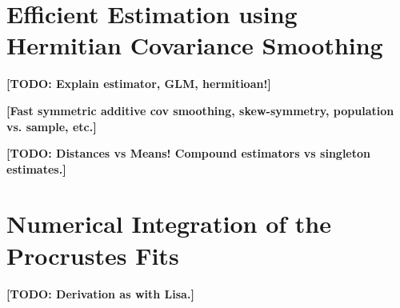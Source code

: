 \begin{comment}
    S_{kl} =& n \, \int_0^1 \int_0^1 b_k(t) \left( \sum_{p,q} \hat{\xi}_{pq} b_q(t) b_p(s) \right) b_l(s) ds dt\\
    =& n \, \sum_{p,q} \hat{\xi}_{pq} \int_0^1 \int_0^1 b_k(t) b_q(t) b_p(s) b_l(s) ds dt\\
    =& n \, \sum_{p,q} \hat{\xi}_{pq} \langle b_k, b_q \rangle \langle b_p, b_l \rangle\\
    =& n \, \sum_{p,q} \hat{\xi}_{pq} g_{kq} g_{pl}
\end{align*}
where $g_{ij}$, $i,j = 1, \dots, k$ are the elements of the Gram matrix $G = bb^T$ with $G = \mathbb{I}_k$ in the special case of an orthogonal basis.
We can then write the write the matrix $S$ as a function of the estimated coefficient matrix $\hat{\Xi} = (\hat{\xi}_{ij})_{i,j = 1, \dots, k}$ :
\begin{align*}
    S =& n \, G \hat{\Xi} G
\end{align*}
The full Procrustes mean of SRV curves is then given by the solution to the optimization problem
\begin{align*}
    \hat{\mu} =& \argmax_{\theta} n \, \theta^H G \hat{\Xi} G \theta \quad \text{subj. to} \quad ||b^T \theta|| = 1 \\
    =& \argmax_{\theta : ||b^T\theta||=1} \, \theta^H G \hat{\Xi} G \theta \quad \text{subj. to} \quad \theta^H G \theta = 1
\end{align*}
One may solve this by using Lagrange optimization with the Langrangian
\begin{align*}
  \mathcal{L}(\theta,\lambda) =& \, \theta^H G \hat{\Xi} G \theta - \lambda ( \theta^H G \theta - 1)
\end{align*}

\end{comment}



\section{Efficient Estimation using Hermitian Covariance Smoothing}

\textbf{[TODO: Explain estimator, GLM, hermitioan!]}

\textbf{[Fast symmetric additive cov smoothing, skew-symmetry, population vs. sample, etc.]}

\textbf{[TODO: Distances vs Means! Compound estimators vs singleton estimates.]}



\begin{comment}
Consider the following model for independent curves
\begin{equation}
    Y_i(t_{ij}) = \mu(t_{ij}, \mathbf{x}_i) + E_i(t_{ij}) + \epsilon(t_{ij}),
    \quad j = 1,\dots,D_i, \, i = 1,\dots,n,
\end{equation}
\end{comment}


\section{Numerical Integration of the Procrustes Fits}

\textbf{[TODO: Derivation as with Lisa.]}

